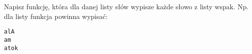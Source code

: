 % 
% 
% 
% 



%
%

\dbEntryCheckResults
Napisz funkcję, która dla danej listy słów wypisze każde słowo z listy wspak. Np. dla listy  funkcja powinna wypisać:
\begin{Verbatim}
alA
am
atok
\end{Verbatim}

